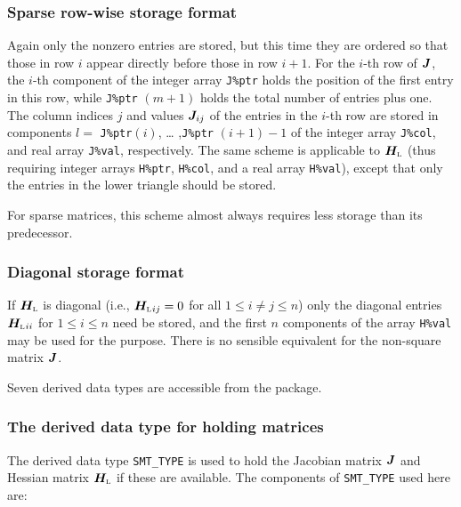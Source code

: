 \documentclass{galahad}
\newcommand{\bmHL}{\bmH\sub{L}}
\begin{document}
\subsubsection{Sparse row-wise storage format}\label{rowwise}
Again only the nonzero entries are stored, but this time they are
ordered so that those in row $i$ appear directly before those in row
$i+1$. For the $i$-th row of ${\bm{J}}$, the $i$-th component of the integer
array {\tt J\%ptr} holds the position of the first entry in this row,
while {\tt J\%ptr} $(m+1)$ holds the total number of entries plus one.
The column indices $j$ and values ${\bm{J}}_{ij}$ of the entries in the
$i$-th row are stored in components $l =$ {\tt J\%ptr}$(i)$, \ldots
,{\tt J\%ptr} $(i+1)-1$ of the integer array {\tt J\%col}, and real
array {\tt J\%val}, respectively.
The same scheme is applicable to
$\bmHL$ (thus requiring integer arrays {\tt H\%ptr}, {\tt H\%col}, and
a real array {\tt H\%val}),
except that only the entries in the lower triangle should be stored.

For sparse matrices, this scheme almost always requires less storage than
its predecessor.

\subsubsection{Diagonal storage format}\label{diagonal}
If $\bmHL$ is diagonal (i.e., $\bmHL{}_{ij} = 0$ for all 
$1 \leq i \neq j \leq n$)
only the diagonal entries $\bmHL{}_{ii}$ for $1 \leq i \leq n$ need be stored,
and the first $n$ components of the array {\tt H\%val} may be used for
the purpose. There is no sensible equivalent for the non-square matrix ${\bm{J}}$.





\galtypes
Seven derived data types are accessible from the package.


\subsubsection{The derived data type for holding matrices}\label{typesmt}
The derived data type {\tt SMT\_TYPE} is used to hold the Jacobian matrix 
${\bm{J}}$ and Hessian matrix $\bmHL$
if these are available. The components of {\tt SMT\_TYPE} used here are:
\end{document}
